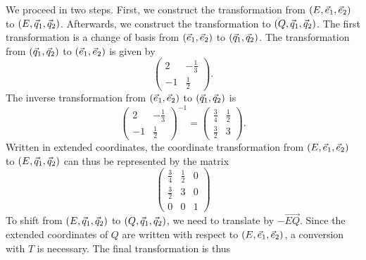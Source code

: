 \documentclass[english]{exercise}
\begin{document}
    We proceed in two steps.
    First, we construct the transformation from \(\parentheses*{E, \vec{e}_1, \vec{e}_2}\) to \(\parentheses*{E, \vec{q}_1, \vec{q}_2}\).
    Afterwards, we construct the transformation to \(\parentheses*{Q, \vec{q}_1, \vec{q}_2}\).
    The first transformation is a change of basis from \(\parentheses*{\vec{e}_1, \vec{e}_2}\) to \(\parentheses*{\vec{q}_1, \vec{q}_2}\).
    The transformation from \(\parentheses*{\vec{q}_1, \vec{q}_2}\) to \(\parentheses*{\vec{e}_1, \vec{e}_2}\) is given by
    \[
        \begin{pmatrix}
            2 & -\frac{1}{3}\\
            -1 & \frac{1}{2}
        \end{pmatrix}.
    \]
    The inverse transformation from \(\parentheses*{\vec{e}_1, \vec{e}_2}\) to \(\parentheses*{\vec{q}_1, \vec{q}_2}\) is
    \[
        \begin{pmatrix}
            2 & -\frac{1}{3}\\
            -1 & \frac{1}{2}
        \end{pmatrix}^{-1} = \begin{pmatrix}
            \frac{3}{4} & \frac{1}{2}\\
            \frac{3}{2} & 3
        \end{pmatrix}.
    \]
    Written in extended coordinates, the coordinate transformation from \(\parentheses*{E, \vec{e}_1, \vec{e}_2}\) to \(\parentheses*{E, \vec{q}_1, \vec{q}_2}\) can thus be represented by the matrix
    \[
        \begin{pmatrix}
            \frac{3}{4} & \frac{1}{2} & 0\\
            \frac{3}{2} & 3 & 0\\
            0 & 0 & 1
        \end{pmatrix}
    \]
    To shift from \(\parentheses*{E, \vec{q}_1, \vec{q}_2}\) to \(\parentheses*{Q, \vec{q}_1, \vec{q}_2}\), we need to translate by \(-\vec{EQ}\).
    Since the extended coordinates of \(Q\) are written with respect to \(\parentheses*{E, \vec{e}_1, \vec{e}_2}\), a conversion with \(T\) is necessary.
    The final transformation is thus
\end{document}
